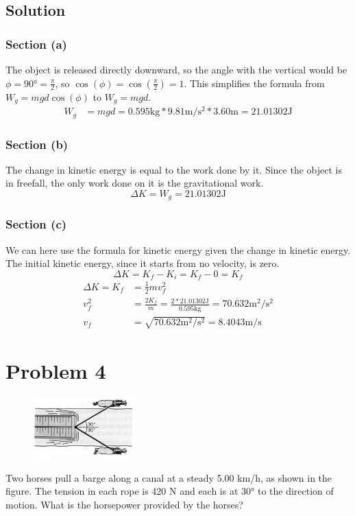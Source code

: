 \documentclass[12pt]{article}
\begin{document}
\subsection*{Solution}
\subsubsection*{Section (a)}
The object is released directly downward, so the angle with the vertical would be $ \phi = 90 \unit{\degree} = \frac{\pi}{2} $, so $\cos(\phi) = \cos(\frac{\pi}{2}) = 1$. This simplifies the formula from $W_g = mgd\cos(\phi)$ to $W_g = mgd$.
\begin{align*}
    W_g &=  mgd
        =   0.595\unit{\kilo\gram} * 9.81\unit{\meter/\second^2} * 3.60 \unit{\meter} 
        =   \boxed{21.01302\unit{\joule}}
\end{align*}

\subsubsection*{Section (b)}
The change in kinetic energy is equal to the work done by it. Since the object is in freefall, the only work done on it is the gravitational work.
\[ \Delta K = W_g = \boxed{21.01302\unit{\joule}} \]

\subsubsection*{Section (c)}
We can here use the formula for kinetic energy given the change in kinetic energy. The initial kinetic energy, since it starts from no velocity, is zero.
\[ \Delta K = K_f - K_i = K_f - 0 = K_f \]
\begin{align*}
    \Delta K    = K_f   &= \frac{1}{2}mv_f^2\\
    v_f^2   &=  \frac{2K_f}{m} = \frac{2*21.01302\unit{\joule}}{0.595\unit{\kilo\gram}} = 70.632 \unit{\meter^2/\second^2}\\
    v_f     &=  \sqrt{70.632 \unit{\meter^2/\second^2}} = \boxed{8.4043 \unit{\meter/\second}}
\end{align*}

\pagebreak
\section*{Problem 4}
\begin{figure}
    \vspace{-30pt}
    \includegraphics[width=0.35\textwidth]{graph_4.png} 
\end{figure}
Two horses pull a barge along a canal at a steady 5.00 km/h, as shown in the figure. The tension in each rope is 420 N and each is at 30\unit{\degree} to the direction of motion. What is the horsepower provided by the horses?
\end{document}
